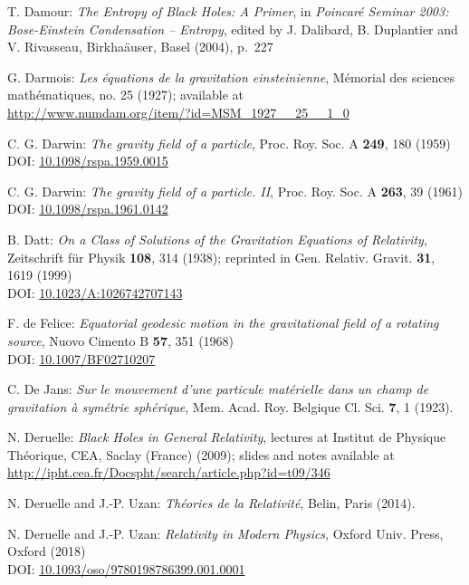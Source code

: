 \begin{thebibliography}{123}
T. Damour: {\em The Entropy of Black Holes: A Primer},
in {\em Poincaré Seminar 2003: Bose-Einstein Condensation -- Entropy},
edited by J. Dalibard, B. Duplantier and V. Rivasseau, Birkha\"auser, Basel (2004),
p.~227

G. Darmois:
{\em Les équations de la gravitation einsteinienne},
Mémorial des sciences mathématiques, no. 25 (1927); available at\\
\url{http://www.numdam.org/item/?id=MSM_1927__25__1_0}

C. G. Darwin: {\em The gravity field of a particle},
Proc. Roy. Soc. A {\bf 249}, 180 (1959)\\
DOI: \href{https://doi.org/10.1098/rspa.1959.0015}{10.1098/rspa.1959.0015}

C. G. Darwin: {\em The gravity field of a particle. II},
Proc. Roy. Soc. A {\bf 263}, 39 (1961)\\
DOI: \href{https://doi.org/10.1098/rspa.1961.0142}{10.1098/rspa.1961.0142}

B. Datt:
{\em On a Class of Solutions of the Gravitation Equations of Relativity},
Zeitschrift für Physik {\bf 108}, 314 (1938);
reprinted in Gen. Relativ. Gravit. {\bf 31}, 1619 (1999)\\
DOI: \href{https://doi.org/10.1023/A:1026742707143}{10.1023/A:1026742707143}

F. de Felice:
{\em Equatorial geodesic motion in the gravitational field of a rotating source},
Nuovo Cimento B {\bf 57}, 351 (1968)\\
DOI: \href{https://doi.org/10.1007/BF02710207}{10.1007/BF02710207}

C. De Jans:
\emph{Sur le mouvement d'une particule matérielle dans un champ de gravitation à symétrie sphérique},
Mem. Acad. Roy. Belgique Cl. Sci. {\bf 7}, 1 (1923).

N. Deruelle: {\em Black Holes in General Relativity}, lectures at
Institut de Physique Théorique, CEA, Saclay (France) (2009); slides and notes
available at \\
\url{http://ipht.cea.fr/Docspht/search/article.php?id=t09/346}

N. Deruelle and J.-P. Uzan: {\em Th\'eories de la Relativit\'e},
Belin, Paris (2014).

N. Deruelle and J.-P. Uzan: {\em Relativity in Modern Physics},
Oxford Univ. Press, Oxford (2018)\\
DOI: \href{https://doi.org/10.1093/oso/9780198786399.001.0001}{10.1093/oso/9780198786399.001.0001}


\end{thebibliography}
